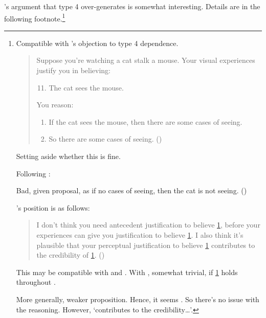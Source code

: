 \begin{note}
  \citeauthor{Pryor:2004ws}'s argument that type 4 over-generates is somewhat interesting.
  Details are in the following footnote.\footnote{
  Compatible with \citeauthor{Pryor:2004ws}'s objection to type 4 dependence.

    \begin{quote}
      Suppose you're watching a cat stalk a mouse. Your visual experiences justify you in believing:

      \begin{enumerate}[label=(\arabic*), ref=(\arabic*)]
        \setcounter{enumi}{10}
      \item
        \label{illu:Pryor:cat:1}
        The cat sees the mouse.
      \end{enumerate}

      You reason:

      \begin{enumerate}[label=(\arabic*), ref=(\arabic*), resume]
      \item
        \label{illu:Pryor:cat:2}
        If the cat sees the mouse, then there are some cases of seeing.
      \item
        \label{illu:Pryor:cat:3}
        So there are some cases of seeing.\nolinebreak
        \mbox{}\hfill\mbox{(\citeyear[361]{Pryor:2004ws})}
      \end{enumerate}
    \end{quote}

  Setting aside whether this is fine.

  Following \citeauthor{Pryor:2004ws}:

  Bad, given proposal, as if no cases of seeing, then the cat is not seeing. (\citeyear[361]{Pryor:2004ws})

  \citeauthor{Pryor:2004ws}'s position is as follows:

  \begin{quote}
    I don't think you need antecedent justification to believe \ref{illu:Pryor:cat:3}, before your experiences can give you justification to believe \ref{illu:Pryor:cat:1}.
    I also think it's plausible that your perceptual justification to believe \ref{illu:Pryor:cat:1} contributes to the credibility of \ref{illu:Pryor:cat:3}.\nolinebreak
    \mbox{}\hfill\mbox{(\citeyear[361]{Pryor:2004ws})}
  \end{quote}

  This may be compatible with \ideaS{} and \ideaCS{}.
  With \ideaCS{}, somewhat trivial, if \ref{illu:Pryor:cat:3} holds throughout .

  More generally, weaker proposition.
  Hence, it seems .
  So there's no issue with the reasoning.
  However, `contributes to the credibility\dots'.
  }
\end{note}



